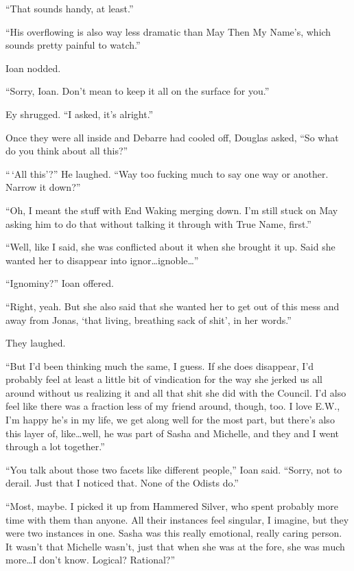 ``That sounds handy, at least.''

``His overflowing is also way less dramatic than May Then My Name's, which sounds pretty painful to watch.''

Ioan nodded.

``Sorry, Ioan. Don't mean to keep it all on the surface for you.''

Ey shrugged. ``I asked, it's alright.''

Once they were all inside and Debarre had cooled off, Douglas asked, ``So what do you think about all this?''

``\,`All this'?'' He laughed. ``Way too fucking much to say one way or another. Narrow it down?''

``Oh, I meant the stuff with End Waking merging down. I'm still stuck on May asking him to do that without talking it through with True Name, first.''

``Well, like I said, she was conflicted about it when she brought it up. Said she wanted her to disappear into ignor\ldots ignoble\ldots{}''

``Ignominy?'' Ioan offered.

``Right, yeah. But she also said that she wanted her to get out of this mess and away from Jonas, `that living, breathing sack of shit', in her words.''

They laughed.

``But I'd been thinking much the same, I guess. If she does disappear, I'd probably feel at least a little bit of vindication for the way she jerked us all around without us realizing it and all that shit she did with the Council. I'd also feel like there was a fraction less of my friend around, though, too. I love E.W., I'm happy he's in my life, we get along well for the most part, but there's also this layer of, like\ldots well, he was part of Sasha and Michelle, and they and I went through a lot together.''

``You talk about those two facets like different people,'' Ioan said. ``Sorry, not to derail. Just that I noticed that. None of the Odists do.''

``Most, maybe. I picked it up from Hammered Silver, who spent probably more time with them than anyone. All their instances feel singular, I imagine, but they were two instances in one. Sasha was this really emotional, really caring person. It wasn't that Michelle wasn't, just that when she was at the fore, she was much more\ldots I don't know. Logical? Rational?''

